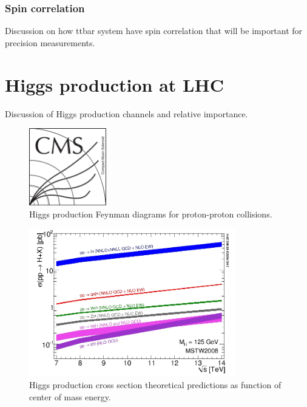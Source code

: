 
\subsubsection{Spin correlation}

Discussion on how ttbar system have spin correlation that will be important for precision measurements.

\section{Higgs production at LHC}

Discussion of Higgs production channels and relative importance.

\begin{figure}[!Hhtbp]
  \begin{center}
    \includegraphics[width=0.3\textwidth]{figs/CMSlogo.png}
    \caption{Higgs production Feynman diagrams for proton-proton collisions.}
    \label{fig:HiggsProd}
  \end{center}
\end{figure}

\begin{figure}[!Hhtbp]
  \begin{center}
    \includegraphics[width=0.8\textwidth]{figs/7-14_Higgs_xsec.jpg}
    \caption{Higgs production cross section theoretical predictions as function of center of mass energy.}
    \label{fig:HiggsProdXS}
  \end{center}
\end{figure}

